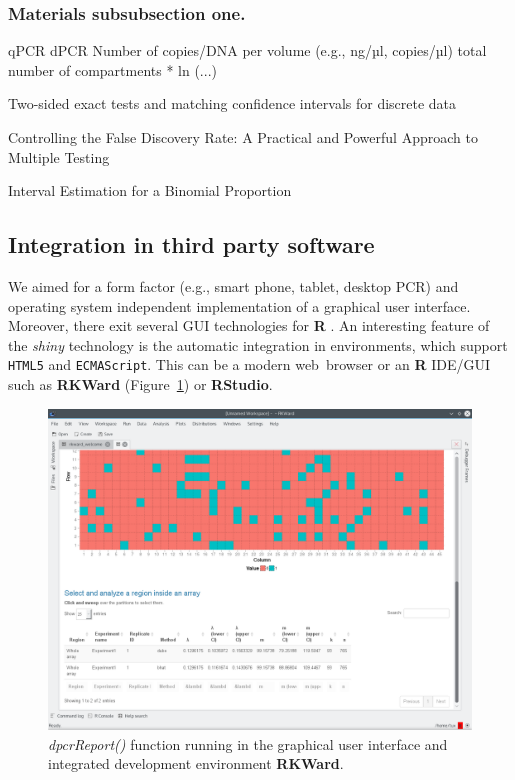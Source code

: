\documentclass[a4,center,fleqn]{NAR}
\begin{document}
\subsubsection{Materials subsubsection one.}

qPCR	dPCR
Number of copies/DNA per volume (e.g., ng/µl, copies/µl)	total number of compartments * ln (...)

Two-sided exact tests and matching confidence intervals for discrete data \cite{fay_2010}

Controlling the False Discovery Rate: A Practical and Powerful Approach to Multiple Testing \cite{benjamini_1995}

Interval Estimation for a Binomial Proportion \cite{brown_2001}

\subsection{Integration in third party software}

We aimed for a form factor (e.g., smart phone, tablet, desktop PCR) and 
operating system independent implementation of a graphical user interface. 
Moreover, there exit several GUI technologies for \textbf{R} 
\cite{rodiger_rkward_2012}. An interesting feature of the \textit{shiny} 
technology is the automatic integration in environments, which support 
\texttt{HTML5} and \texttt{ECMAScript}. This can be a modern web~browser or an 
\textbf{R} IDE/GUI such as \textbf{RKWard} (Figure~\ref{GUI_RKWard_1}) or 
\textbf{RStudio}.

\begin{figure}[t]
\begin{center}
\includegraphics[width=17cm]{GUI_RKWard_1.png}
\end{center}
\caption{\textit{dpcrReport()} function running in the graphical user interface and integrated development environment \textbf{RKWard}.}
\label{GUI_RKWard_1}
\end{figure}
\end{document}
